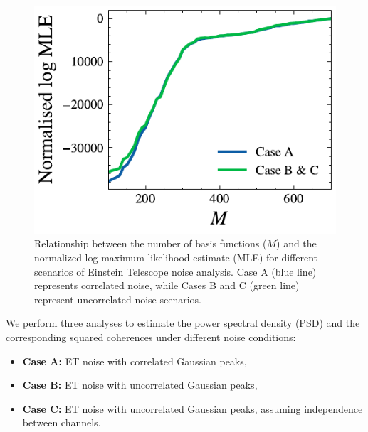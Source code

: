 \documentclass[%
 reprint,
 amsmath,amssymb,
 aps,
 nofootinbib,
]{revtex4-2}
\begin{document}


\begin{figure}[!t]
\centering
  \includegraphics[width=\columnwidth]{et_basis_fns.pdf}
  \caption{Relationship between the number of basis functions ($M$) and the normalized log maximum likelihood estimate (MLE) for different scenarios of Einstein Telescope noise analysis. Case A (blue line) represents correlated noise, while Cases B and C (green line) represent uncorrelated noise scenarios.
  }
  \label{et_corr_basis_funs_vs_mle}
\end{figure}


We perform three analyses to estimate the power spectral density (PSD) and the corresponding squared coherences under different noise conditions: 
\begin{itemize}
    \item[] \textbf{Case A:}  ET noise with correlated Gaussian peaks,
    \item[] \textbf{Case B:} ET noise with uncorrelated Gaussian peaks,
    \item[] \textbf{Case C:} ET noise with uncorrelated Gaussian peaks, assuming independence between channels.
\end{itemize}
\end{document}
